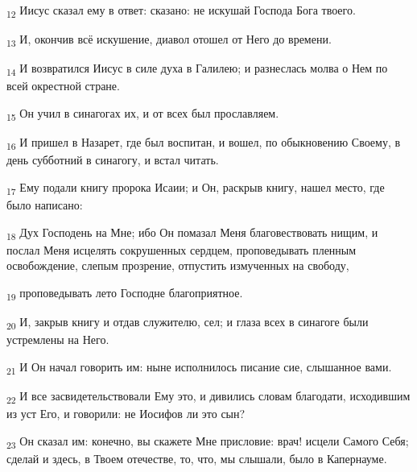 \begin{tcolorbox}
\textsubscript{12} Иисус сказал ему в ответ: сказано: не искушай Господа Бога твоего.
\end{tcolorbox}
\begin{tcolorbox}
\textsubscript{13} И, окончив всё искушение, диавол отошел от Него до времени.
\end{tcolorbox}
\begin{tcolorbox}
\textsubscript{14} И возвратился Иисус в силе духа в Галилею; и разнеслась молва о Нем по всей окрестной стране.
\end{tcolorbox}
\begin{tcolorbox}
\textsubscript{15} Он учил в синагогах их, и от всех был прославляем.
\end{tcolorbox}
\begin{tcolorbox}
\textsubscript{16} И пришел в Назарет, где был воспитан, и вошел, по обыкновению Своему, в день субботний в синагогу, и встал читать.
\end{tcolorbox}
\begin{tcolorbox}
\textsubscript{17} Ему подали книгу пророка Исаии; и Он, раскрыв книгу, нашел место, где было написано:
\end{tcolorbox}
\begin{tcolorbox}
\textsubscript{18} Дух Господень на Мне; ибо Он помазал Меня благовествовать нищим, и послал Меня исцелять сокрушенных сердцем, проповедывать пленным освобождение, слепым прозрение, отпустить измученных на свободу,
\end{tcolorbox}
\begin{tcolorbox}
\textsubscript{19} проповедывать лето Господне благоприятное.
\end{tcolorbox}
\begin{tcolorbox}
\textsubscript{20} И, закрыв книгу и отдав служителю, сел; и глаза всех в синагоге были устремлены на Него.
\end{tcolorbox}
\begin{tcolorbox}
\textsubscript{21} И Он начал говорить им: ныне исполнилось писание сие, слышанное вами.
\end{tcolorbox}
\begin{tcolorbox}
\textsubscript{22} И все засвидетельствовали Ему это, и дивились словам благодати, исходившим из уст Его, и говорили: не Иосифов ли это сын?
\end{tcolorbox}
\begin{tcolorbox}
\textsubscript{23} Он сказал им: конечно, вы скажете Мне присловие: врач! исцели Самого Себя; сделай и здесь, в Твоем отечестве, то, что, мы слышали, было в Капернауме.
\end{tcolorbox}
